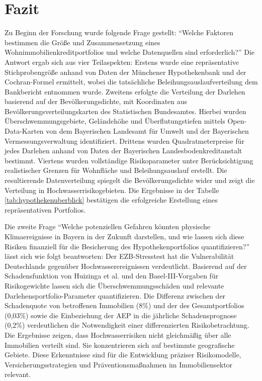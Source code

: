 \section{Fazit}\label{kap:7}
Zu Beginn der Forschung wurde folgende Frage gestellt: \enquote{Welche Faktoren bestimmen die Größe und Zusammensetzung eines Wohnimmobilienkreditportfolios und welche Datenquellen sind erforderlich?}  Die Antwort ergab sich aus vier Teilaspekten: Erstens wurde eine repräsentative Stichprobengröße anhand von Daten der Münchener Hypothekenbank und der Cochran-Formel ermittelt, wobei die tatsächliche Beleihungsauslaufverteilung dem Bankbericht entnommen wurde. Zweitens erfolgte die Verteilung der Darlehen basierend auf der Bevölkerungsdichte, mit Koordinaten aus Bevölkerungsverteilungskarten des Statistischen Bundesamtes. Hierbei wurden Überschwemmungsgebiete, Geländehöhe und Überflutungstiefen mittels Open-Data-Karten von \textcite{suche_postleitzahl} dem Bayerischen Landesamt für Umwelt und der Bayerischen Vermessungsverwaltung identifiziert. Drittens wurden Quadratmeterpreise für jedes Darlehen anhand von Daten der Bayerischen Landesbodenkreditanstalt bestimmt. Viertens wurden vollständige Risikoparameter unter Berücksichtigung realistischer Grenzen für Wohnfläche und Beleihungsauslauf erstellt. Die resultierende Datenverteilung spiegelt die Bevölkerungsdichte wider und zeigt die Verteilung in Hochwasserrisikogebieten. Die Ergebnisse in der Tabelle \ref{tab:hypothekenuberblick} bestätigen die erfolgreiche Erstellung eines repräsentativen Portfolios.

Die zweite Frage \enquote{Welche potenziellen Gefahren könnten physische Klimaereignisse in Bayern in der Zukunft darstellen, und wie lassen sich diese Risiken finanziell für die Besicherung des Hypothekenportfolios quantifizieren?} lässt sich wie folgt beantworten: Der \ac{EZB}-Stresstest hat die Vulnerabilität Deutschlands gegenüber Hochwasserereignissen verdeutlicht. Basierend auf der Schadensfunktion von Huizinga et al. und den Basel-III-Vorgaben für Risikogewichte lassen sich die Überschwemmungsschäden und relevante Darlehensportfolio-Parameter quantifizieren.  Die Differenz zwischen der Schadenquote von betroffenen Immobilien (8\%) und der des Gesamtportfolios (0,03\%) sowie die Einbeziehung der \ac{AEP} in die jährliche Schadensprognose (0,2\%) verdeutlichen die Notwendigkeit einer differenzierten Risikobetrachtung. Die Ergebnisse zeigen, dass Hochwasserrisiken nicht gleichmäßig über alle Immobilien verteilt sind. Sie konzentrieren sich auf bestimmte geografische Gebiete. Diese Erkenntnisse sind für die Entwicklung präziser Risikomodelle, Versicherungsstrategien und Präventionsmaßnahmen im Immobiliensektor relevant.

